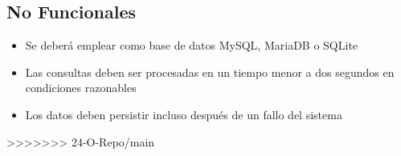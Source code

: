 \subsection*{No Funcionales}
\begin{itemize}
	\item Se deberá emplear como base de datos MySQL, MariaDB o SQLite
	\item Las consultas deben ser procesadas en un tiempo menor a dos segundos en
	condiciones razonables
	\item Los datos deben persistir incluso después de un fallo del sistema
\end{itemize}
>>>>>>> 24-O-Repo/main
